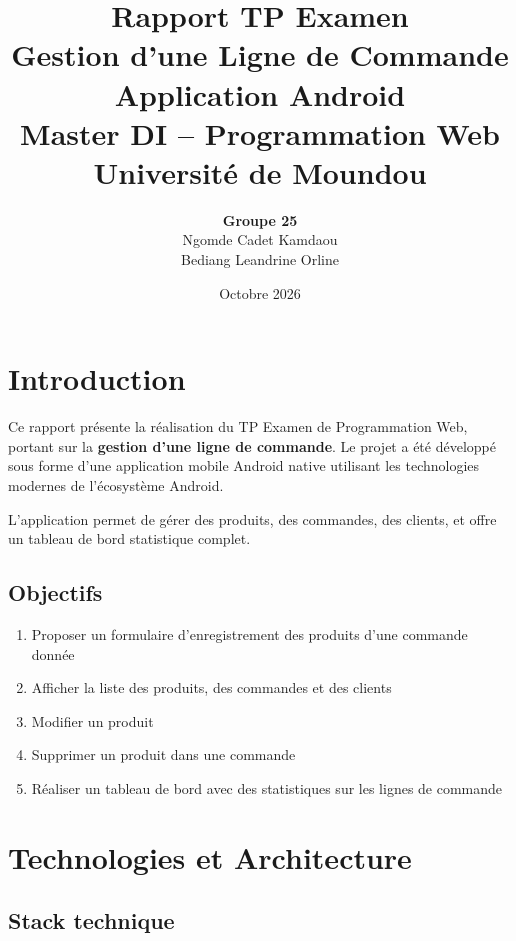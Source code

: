 \documentclass[12pt,a4paper]{article}
\title{
    \vspace{-1cm}
    \textbf{Rapport TP Examen} \\
    \large Gestion d'une Ligne de Commande \\
    \large Application Android \\
    \vspace{0.5cm}
    \normalsize Master DI -- Programmation Web \\
    Universit\'e de Moundou
}
\author{
    \textbf{Groupe 25} \\
    Ngomde Cadet Kamdaou \\
    Bediang Leandrine Orline
}
\date{Octobre 2026}
\begin{document}
\maketitle
\thispagestyle{empty}

\newpage
\tableofcontents
\newpage

\section{Introduction}

Ce rapport pr\'esente la r\'ealisation du TP Examen de Programmation Web, portant sur la \textbf{gestion d'une ligne de commande}. Le projet a \'et\'e d\'evelopp\'e sous forme d'une application mobile Android native utilisant les technologies modernes de l'\'ecosyst\`eme Android.

L'application permet de g\'erer des produits, des commandes, des clients, et offre un tableau de bord statistique complet.

\subsection{Objectifs}
\begin{enumerate}
    \item Proposer un formulaire d'enregistrement des produits d'une commande donn\'ee
    \item Afficher la liste des produits, des commandes et des clients
    \item Modifier un produit
    \item Supprimer un produit dans une commande
    \item R\'ealiser un tableau de bord avec des statistiques sur les lignes de commande
\end{enumerate}

\section{Technologies et Architecture}

\subsection{Stack technique}
\end{document}
